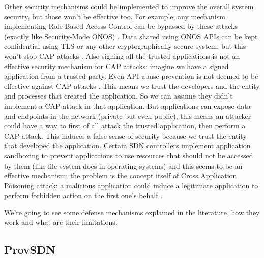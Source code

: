 Other security mechanisms could be implemented to improve the overall system security, but those won't be effective too. For example, any mechanism implementing Role-Based Access Control can be bypassed by these attacks (exactly like Security-Mode ONOS) \cite{secmode}. Data shared using ONOS APIs can be kept confidential using TLS or any other cryptographically secure system, but this won't stop CAP attacks \cite{tlsapis}. Also signing all the trusted applications is not an effective security mechanism for CAP attacks: imagine we have a signed application from a trusted party. Even API abuse prevention is not deemed to be effective against CAP attacks \cite{aegis,dac}. This means we trust the developers and the entity and processes that created the application. So we can assume they didn't implement a CAP attack in that application. But applications can expose data and endpoints in the network (private but even public), this means an attacker could have a way to first of all attack the trusted application, then perform a CAP attack. This induces a false sense of security because we trust the entity that developed the application. Certain SDN controllers implement application sandboxing to prevent applications to use resources that should not be accessed by them (like file system does in operating systems) and this seems to be an effective mechanism; the problem is the concept itself of Cross Application Poisoning attack: a malicious application could induce a legitimate application to perform forbidden action on the first one's behalf \cite{rosemary}.

\medskip
We're going to see some defense mechanisms explained in the literature, how they work and what are their limitations.


\subsection{ProvSDN}

